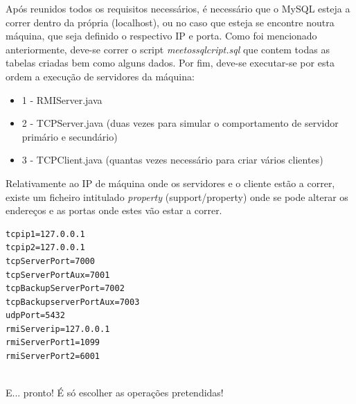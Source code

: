 \documentclass[12pt]{article} %
\begin{document}
Após reunidos todos os requisitos necessários, é necessário que o MySQL esteja a correr dentro da própria (localhost), ou no caso que esteja se encontre noutra máquina, que seja definido o respectivo IP e porta.
Como foi mencionado anteriormente, deve-se correr o script \emph{meetossqlcript.sql} que contem todas as tabelas criadas bem como alguns dados.
Por fim, deve-se executar-se por esta ordem a execução de servidores da máquina:

\begin{itemize}
	\item 1 - RMIServer.java
 	\item 2 - TCPServer.java (duas vezes para simular o comportamento de servidor primário e secundário)
	\item 3 - TCPClient.java (quantas vezes necessário para criar vários clientes)
\end{itemize}

Relativamente ao IP de máquina onde os servidores e o cliente estão a correr, existe um ficheiro intitulado \emph{property} (support/property) onde se pode alterar os endereços e as portas onde estes vão estar a correr.

\begin{verbatim}
tcpip1=127.0.0.1
tcpip2=127.0.0.1
tcpServerPort=7000
tcpServerPortAux=7001
tcpBackupServerPort=7002
tcpBackupserverPortAux=7003
udpPort=5432
rmiServerip=127.0.0.1
rmiServerPort1=1099
rmiServerPort2=6001


\end{verbatim}


E... pronto! É só escolher as operações pretendidas!
\end{document}
